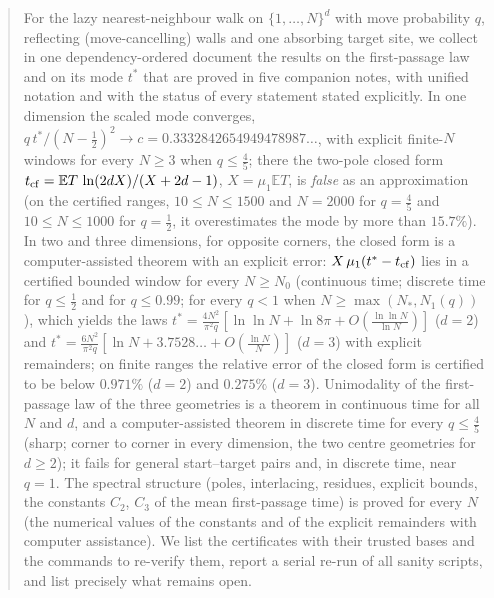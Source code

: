 \documentclass[10pt,a4paper]{article}
\theoremstyle{plain}
\theoremstyle{definition}
\newcommand{\E}{\mathbb{E}}
\begin{document}
\begin{abstract}
For the lazy nearest-neighbour walk on $\{1,\dots,N\}^d$ with move probability $q$, reflecting (move-cancelling) walls and one absorbing target site, we collect in one dependency-ordered document the results on the first-passage law and on its mode $t^*$ that are proved in five companion notes, with unified notation and with the status of every statement stated explicitly. In one dimension the scaled mode converges, $q\,t^*/(N-\frac12)^2\to c=0.3332842654949478987\ldots$, with explicit finite-$N$ windows for every $N\ge3$ when $q\le\frac45$; there the two-pole closed form $t_{\rm cf}=\E T\,\ln(2dX)/(X+2d-1)$, $X=\mu_1\E T$, is \emph{false} as an approximation (on the certified ranges, $10\le N\le1500$ and $N=2000$ for $q=\frac45$ and $10\le N\le1000$ for $q=\frac12$, it overestimates the mode by more than $15.7\%$). In two and three dimensions, for opposite corners, the closed form is a computer-assisted theorem with an explicit error: $X\,\mu_1(t^*-t_{\rm cf})$ lies in a certified bounded window for every $N\ge N_0$ (continuous time; discrete time for $q\le\frac12$ and for $q\le0.99$; for every $q<1$ when $N\ge\max(N_*,N_1(q))$), which yields the laws $t^*=\frac{4N^2}{\pi^2q}[\ln\ln N+\ln 8\pi+O(\frac{\ln\ln N}{\ln N})]$ ($d=2$) and $t^*=\frac{6N^2}{\pi^2q}[\ln N+3.7528\ldots+O(\frac{\ln N}{N})]$ ($d=3$) with explicit remainders; on finite ranges the relative error of the closed form is certified to be below $0.971\%$ ($d=2$) and $0.275\%$ ($d=3$). Unimodality of the first-passage law of the three geometries is a theorem in continuous time for all $N$ and $d$, and a computer-assisted theorem in discrete time for every $q\le\frac45$ (sharp; corner to corner in every dimension, the two centre geometries for $d\ge2$); it fails for general start--target pairs and, in discrete time, near $q=1$. The spectral structure (poles, interlacing, residues, explicit bounds, the constants $C_2$, $C_3$ of the mean first-passage time) is proved for every $N$ (the numerical values of the constants and of the explicit remainders with computer assistance). We list the certificates with their trusted bases and the commands to re-verify them, report a serial re-run of all sanity scripts, and list precisely what remains open.
\end{abstract}
\end{document}
